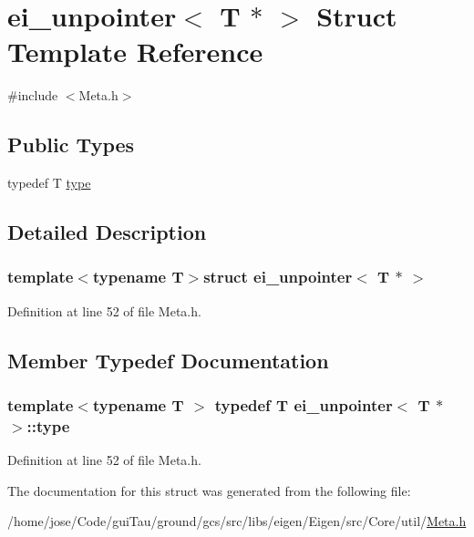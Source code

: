 \hypertarget{structei__unpointer_3_01_t_01_5_01_4}{\section{ei\-\_\-unpointer$<$ T $\ast$ $>$ Struct Template Reference}
\label{structei__unpointer_3_01_t_01_5_01_4}
}


{\ttfamily \#include $<$Meta.\-h$>$}

\subsection*{Public Types}
\begin{DoxyCompactItemize}
\item 
typedef T \hyperlink{structei__unpointer_3_01_t_01_5_01_4_a5bfb62e9e62019bb9f912f023f4f2fa9}{type}
\end{DoxyCompactItemize}


\subsection{Detailed Description}
\subsubsection*{template$<$typename T$>$struct ei\-\_\-unpointer$<$ T $\ast$ $>$}



Definition at line 52 of file Meta.\-h.



\subsection{Member Typedef Documentation}
\hypertarget{structei__unpointer_3_01_t_01_5_01_4_a5bfb62e9e62019bb9f912f023f4f2fa9}{
\subsubsection[{type}]{\setlength{\rightskip}{0pt plus 5cm}template$<$typename T $>$ typedef T {\bf ei\-\_\-unpointer}$<$ T $\ast$ $>$\-::{\bf type}}}\label{structei__unpointer_3_01_t_01_5_01_4_a5bfb62e9e62019bb9f912f023f4f2fa9}


Definition at line 52 of file Meta.\-h.



The documentation for this struct was generated from the following file\-:\begin{DoxyCompactItemize}
\item 
/home/jose/\-Code/gui\-Tau/ground/gcs/src/libs/eigen/\-Eigen/src/\-Core/util/\hyperlink{_meta_8h}{Meta.\-h}\end{DoxyCompactItemize}
